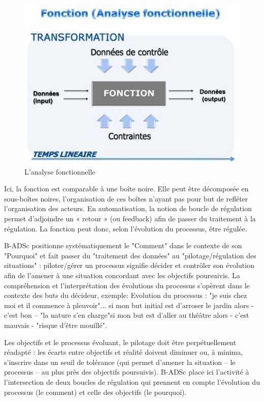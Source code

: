 \begin{figure}[H]
\begin{center}
\includegraphics[width=0.5\linewidth]{images/analyse_fonctionnelle}
\end{center}
\caption{L'analyse fonctionnelle}
\label{fig:9}
\end{figure}

Ici, la fonction est comparable à une boîte noire. Elle peut être décomposée en sous-boîtes noires, l'organisation de ces boîtes n'ayant pas pour but de refléter l'organisation des acteurs. En automatisation, la notion de boucle de régulation permet d’adjoindre un « retour » (ou feedback) afin de passer du traitement à la régulation. La fonction peut donc, selon l’évolution du processus, être régulée.

B-ADSc positionne systématiquement le "Comment" dans le contexte de son "Pourquoi" et fait passer du "traitement des données" au "pilotage/régulation des situations" : piloter/gérer un processus signifie décider et contrôler son évolution afin de l’amener à une situation concordant avec les objectifs poursuivis.
La compréhension et l'interprétation des évolutions du processus s’opèrent dans le contexte des buts du décideur, exemple:
Evolution du processus : "je suis chez moi et il commence à pleuvoir"...
si mon but initial est d’arroser le jardin alors - c’est bon – "la nature s’en charge"si mon but est d’aller au théâtre alors - c’est mauvais - "risque d’être mouillé".

Les objectifs et le processus évoluant, le pilotage doit être perpétuellement réadapté : les écarts entre objectifs et réalité doivent diminuer ou, à minima, s’inscrire dans un seuil de tolérance (qui permet d’amener la situation – le processus – au plus près des objectifs poursuivis).
B-ADSc place ici l'activité à l’intersection de deux boucles de régulation qui prennent en compte l’évolution du processus (le comment) et celle des objectifs (le pourquoi).
 
